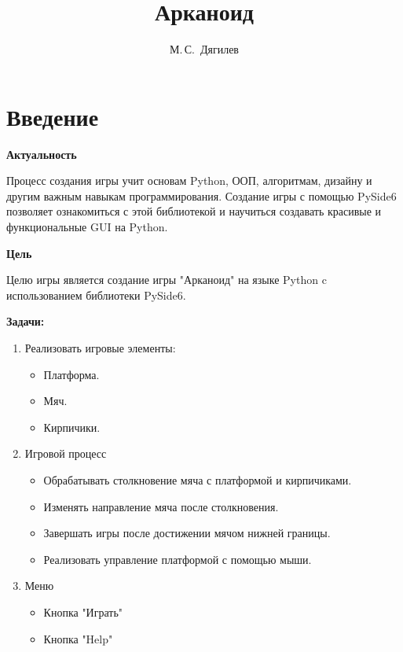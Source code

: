 \documentclass[14pt, oneside]{altsu-report}
\title{Арканоид}
\author{М.\,С.~Дягилев}
\institute{Институт цифровых технологий, электроники и физики}
\date{\the\year}
\begin{document}
\maketitle

\setcounter{page}{2}
\makeabstract
\tableofcontents

\chapter*{Введение}

\textbf{Актуальность} 
\begin{enumerate}
Процесс создания игры учит основам Python, ООП, алгоритмам, дизайну и другим важным навыкам программирования. Создание игры с помощью PySide6 позволяет ознакомиться с этой библиотекой и научиться создавать красивые и функциональные GUI на Python.
\end{enumerate}

\textbf{Цель}
\begin{enumerate}
Целю игры является создание игры "Арканоид" на языке Python c использованием библиотеки PySide6.
\end{enumerate}

\textbf{Задачи:}
\begin{enumerate}
\item Реализовать игровые элементы:
\begin{itemize}
    \item Платформа.
    \item Мяч.
    \item Кирпичики.
\end{itemize}
\item Игровой процесс
\begin{itemize}
    \item Обрабатывать столкновение мяча с платформой и кирпичиками.
    \item Изменять направление мяча после столкновения.
    \item Завершать игры после достижении мячом нижней границы.
    \item Реализовать управление платформой с помощью мыши.
\end{itemize}
\item Меню
\begin{itemize}
    \item Кнопка "Играть"
    \item Кнопка "Help"
\end{itemize}
\end{enumerate}
\end{document}
